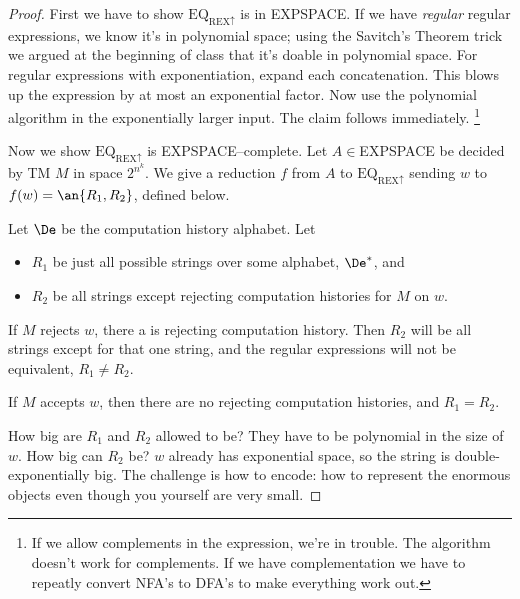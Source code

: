 \begin{proof}
First we have to show $\text{EQ}_{\text{REX}\uparrow}$ is in EXPSPACE. If we have {\it regular} regular expressions, we know it's in polynomial space; using the Savitch's Theorem trick we argued at the beginning of class that it's doable in polynomial space. For regular expressions with exponentiation, expand each concatenation. This blows up the expression by at most an exponential factor. Now use the polynomial algorithm in the exponentially larger input. The claim follows immediately.
\footnote{If we allow complements in the expression, we're in trouble. The algorithm doesn't work for complements. If we have complementation we have to repeatly convert NFA's to DFA's to make everything work out.}

Now we show $\text{EQ}_{\text{REX}\uparrow}$ is EXPSPACE--complete. Let $A\in $EXPSPACE be decided by TM $M$ in space $2^{n^k}$. We give a reduction $f$ from $A$ to $\text{EQ}_{\text{REX}\uparrow}$ sending $w$ to $f(w)=\an{R_1,R_2}$, defined below.



Let $\De$ be the computation history alphabet.
Let 
\begin{itemize}
\item
$R_1$ be just all possible strings over some alphabet, $\De^*$, and
\item
$R_2$ be %
all strings except rejecting 
computation histories for $M$ on $w$. 
\end{itemize}
 
If $M$ rejects $w$, there a is rejecting computation history. Then $R_2$ will be all strings except for that one string, and the regular expressions will not be equivalent, $R_1\ne R_2$.

If $M$ accepts $w$, then there are no rejecting computation histories, and $R_1=R_2$.

How big are $R_1$ and $R_2$ allowed to be? They have to be polynomial in the size of $w$. How big can $R_2$ be? $w$ already has exponential space, so the string is double-exponentially big. %
The challenge is how to encode: how to represent the enormous objects even though you yourself are very small.


\end{proof}
